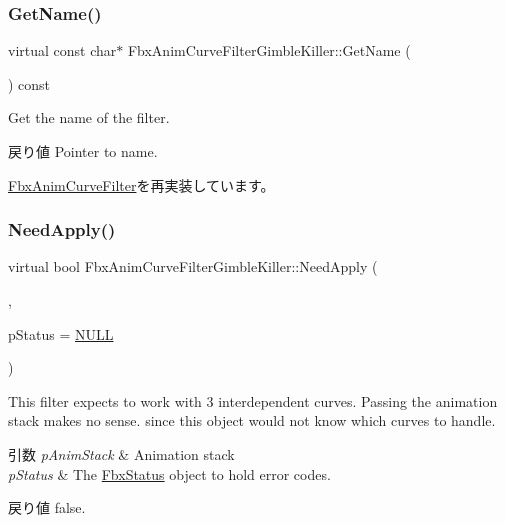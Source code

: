 \subsubsection{\texorpdfstring{Get\+Name()}{GetName()}}
{\footnotesize\ttfamily virtual const char$\ast$ Fbx\+Anim\+Curve\+Filter\+Gimble\+Killer\+::\+Get\+Name (\begin{DoxyParamCaption}{ }\end{DoxyParamCaption}) const\hspace{0.3cm}{\ttfamily [virtual]}}

Get the name of the filter. \begin{DoxyReturn}{戻り値}
Pointer to name. 
\end{DoxyReturn}


\hyperlink{class_fbx_anim_curve_filter_abd559d5052fbb072042e59241940a35c}{Fbx\+Anim\+Curve\+Filter}を再実装しています。

\mbox{\label{class_fbx_anim_curve_filter_gimble_killer_a3b303b3383e638e445e0bd17570be9ea}} 
\subsubsection{\texorpdfstring{Need\+Apply()}{NeedApply()}\hspace{0.1cm}{\footnotesize\ttfamily [1/5]}}
{\footnotesize\ttfamily virtual bool Fbx\+Anim\+Curve\+Filter\+Gimble\+Killer\+::\+Need\+Apply (\begin{DoxyParamCaption}\item[{\hyperlink{class_fbx_anim_stack}{Fbx\+Anim\+Stack} $\ast$}]{,  }\item[{\hyperlink{class_fbx_status}{Fbx\+Status} $\ast$}]{p\+Status = {\ttfamily \hyperlink{fbxarch_8h_a070d2ce7b6bb7e5c05602aa8c308d0c4}{N\+U\+LL}} }\end{DoxyParamCaption})\hspace{0.3cm}{\ttfamily [virtual]}}

This filter expects to work with 3 interdependent curves. Passing the animation stack makes no sense. since this object would not know which curves to handle. 
\begin{DoxyParams}{引数}
{\em p\+Anim\+Stack} & Animation stack \\
\hline
{\em p\+Status} & The \hyperlink{class_fbx_status}{Fbx\+Status} object to hold error codes. \\
\hline
\end{DoxyParams}
\begin{DoxyReturn}{戻り値}
{\ttfamily false}. 
\end{DoxyReturn}


